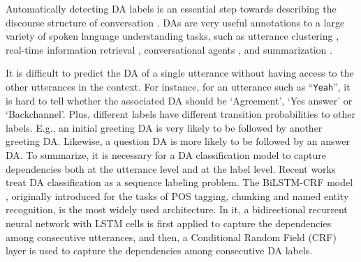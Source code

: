 \documentclass[11pt,a4paper]{article}
\begin{document}
Automatically detecting DA labels is an essential step towards describing the discourse structure of conversation \citep{jurafsky1997switchboard}.
DAs are very useful annotations to a large variety of spoken language understanding tasks, such as utterance clustering \citep{shang2019energy}, real-time information retrieval \cite{meladianos2017real}, conversational agents \citep{higashinaka-etal-2014-towards,ahmadvand2019contextual}, and summarization \cite{shang2018unsupervised}.

\begin{table}[t]
\small
\centering
\setlength{\tabcolsep}{3pt} \renewcommand{\arraystretch}{1.1} 
\caption{Fragment from SwDA conversation sw3332. Statement-non-opinion (sd), Non-verbal (x), Interruption (+), Acknowledge/Backchannel (b), Yes-No-Question (qy), Negative non-no answers (ng).}
\label{table:conversation_sample}
\end{table}

It is difficult to predict the DA of a single utterance without having access to the other utterances in the context. For instance, for an utterance such as ``{\small\texttt{Yeah}}'', it is hard to tell whether the associated DA should be `Agreement', `Yes answer' or `Backchannel'. 
Plus, different labels have different transition probabilities to other labels.
E.g., an initial greeting DA is very likely to be followed by another greeting DA.
Likewise, a question DA is more likely to be followed by an answer DA.
To summarize, it is necessary for a DA classification model to capture dependencies both at the utterance level and at the label level.
Recent works \citep{li-wu-2016-multi,tran-etal-2017-hierarchical,liu-etal-2017-using-context,kumar2018dialogue,chen2018dialogue,raheja-tetreault-2019-dialogue,li-etal-2019-dual} treat DA classification as a sequence labeling problem.
The BiLSTM-CRF model \citep{huang2015bidirectional,lample-etal-2016-neural}, originally introduced for the tasks of POS tagging, chunking and named entity recognition, is the most widely used architecture.
In it, a bidirectional recurrent neural network with LSTM cells is first applied to capture the dependencies among consecutive utterances, and then, a Conditional Random Field (CRF) layer is used to capture the dependencies among consecutive DA labels.
\end{document}
